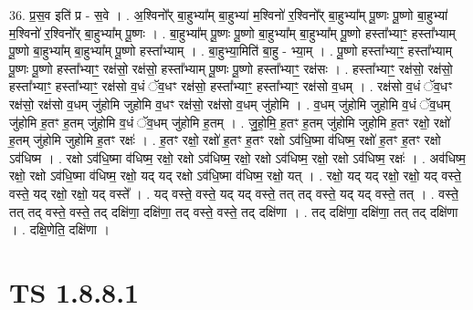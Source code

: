 \documentclass[17pt]{extarticle}
\begin{document}
36. प्र॒स॒व इति॑ प्र - स॒वे । . अ॒श्विनो᳚र् बा॒हुभ्या᳚म् बा॒हुभ्या॑ म॒श्विनो॑ र॒श्विनो᳚र् बा॒हुभ्या᳚म् पू॒ष्णः पू॒ष्णो बा॒हुभ्या॑ म॒श्विनो॑ र॒श्विनो᳚र् बा॒हुभ्या᳚म् पू॒ष्णः । . बा॒हुभ्या᳚म् पू॒ष्णः पू॒ष्णो बा॒हुभ्या᳚म् बा॒हुभ्या᳚म् पू॒ष्णो हस्ता᳚भ्याꣳ॒॒ हस्ता᳚भ्याम् पू॒ष्णो बा॒हुभ्या᳚म् बा॒हुभ्या᳚म् पू॒ष्णो हस्ता᳚भ्याम् । . बा॒हुभ्या॒मिति॑ बा॒हु - भ्या॒म् । . पू॒ष्णो हस्ता᳚भ्याꣳ॒॒ हस्ता᳚भ्याम् पू॒ष्णः पू॒ष्णो हस्ता᳚भ्याꣳ॒॒ रक्ष॑सो॒ रक्ष॑सो॒ हस्ता᳚भ्याम् पू॒ष्णः पू॒ष्णो हस्ता᳚भ्याꣳ॒॒ रक्ष॑सः । . हस्ता᳚भ्याꣳ॒॒ रक्ष॑सो॒ रक्ष॑सो॒ हस्ता᳚भ्याꣳ॒॒ हस्ता᳚भ्याꣳ॒॒ रक्ष॑सो व॒धं ॅव॒धꣳ रक्ष॑सो॒ हस्ता᳚भ्याꣳ॒॒ हस्ता᳚भ्याꣳ॒॒ रक्ष॑सो व॒धम् । . रक्ष॑सो व॒धं ॅव॒धꣳ रक्ष॑सो॒ रक्ष॑सो व॒धम् जु॑होमि जुहोमि व॒धꣳ रक्ष॑सो॒ रक्ष॑सो व॒धम् जु॑होमि । . व॒धम् जु॑होमि जुहोमि व॒धं ॅव॒धम् जु॑होमि ह॒तꣳ ह॒तम् जु॑होमि व॒धं ॅव॒धम् जु॑होमि ह॒तम् । . जु॒हो॒मि॒ ह॒तꣳ ह॒तम् जु॑होमि जुहोमि ह॒तꣳ रक्षो॒ रक्षो॑ ह॒तम् जु॑होमि जुहोमि ह॒तꣳ रक्षः॑ । . ह॒तꣳ रक्षो॒ रक्षो॑ ह॒तꣳ ह॒तꣳ रक्षो ऽव॑धि॒ष्मा व॑धिष्म॒ रक्षो॑ ह॒तꣳ ह॒तꣳ रक्षो ऽव॑धिष्म । . रक्षो ऽव॑धि॒ष्मा व॑धिष्म॒ रक्षो॒ रक्षो ऽव॑धिष्म॒ रक्षो॒ रक्षो ऽव॑धिष्म॒ रक्षो॒ रक्षो ऽव॑धिष्म॒ रक्षः॑ । . अव॑धिष्म॒ रक्षो॒ रक्षो ऽव॑धि॒ष्मा व॑धिष्म॒ रक्षो॒ यद् यद् रक्षो ऽव॑धि॒ष्मा व॑धिष्म॒ रक्षो॒ यत् । . रक्षो॒ यद् यद् रक्षो॒ रक्षो॒ यद् वस्ते॒ वस्ते॒ यद् रक्षो॒ रक्षो॒ यद् वस्ते᳚ । . यद् वस्ते॒ वस्ते॒ यद् यद् वस्ते॒ तत् तद् वस्ते॒ यद् यद् वस्ते॒ तत् । . वस्ते॒ तत् तद् वस्ते॒ वस्ते॒ तद् दक्षि॑णा॒ दक्षि॑णा॒ तद् वस्ते॒ वस्ते॒ तद् दक्षि॑णा । . तद् दक्षि॑णा॒ दक्षि॑णा॒ तत् तद् दक्षि॑णा । . दक्षि॒णेति॒ दक्षि॑णा । \newline
\pagebreak
{}

\section{ TS 1.8.8.1 }
\end{document}
